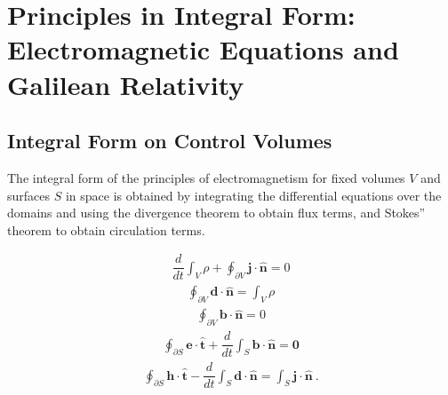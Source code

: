 \documentclass[letterpaper,10pt,italian]{jupyterBook}
\begin{document}
\section{Principles in Integral Form: Electromagnetic Equations and Galilean Relativity}
\label{\detokenize{ch/principles:principles-in-integral-form-electromagnetic-equations-and-galilean-relativity}}\label{\detokenize{ch/principles:classical-electromagnetism-principles-integral}}

\subsection{Integral Form on Control Volumes}
\label{\detokenize{ch/principles:integral-form-on-control-volumes}}\label{\detokenize{ch/principles:classical-electromagnetism-principles-integral-control-volume}}
\sphinxAtStartPar
The integral form of the principles of electromagnetism for fixed volumes \(V\) and surfaces \(S\) in space is obtained by integrating the differential equations over the domains and using the divergence theorem to obtain flux terms, and Stokes” theorem to obtain circulation terms.

\sphinxAtStartPar
{}
\begin{equation*}
\begin{split}
    \dfrac{d}{dt} \int_{V} \rho + \oint_{\partial V} \mathbf{j} \cdot \hat{\mathbf{n}} = 0
\end{split}
\end{equation*}
\sphinxAtStartPar
{}
\begin{equation*}
\begin{split}
    \oint_{\partial V} \mathbf{d} \cdot \mathbf{\hat{n}} = \int_{V} \rho
\end{split}
\end{equation*}
\sphinxAtStartPar
{}
\begin{equation*}
\begin{split}
    \oint_{\partial V} \mathbf{b} \cdot \mathbf{\hat{n}} = 0
\end{split}
\end{equation*}
\sphinxAtStartPar
{}
\begin{equation*}
\begin{split}
    \oint_{\partial S} \mathbf{e} \cdot \hat{\mathbf{t}} + \dfrac{d}{dt} \int_{S} \mathbf{b} \cdot \hat{\mathbf{n}} = \mathbf{0}
\end{split}
\end{equation*}
\sphinxAtStartPar
{}
\begin{equation*}
\begin{split}
    \oint_{\partial S} \mathbf{h} \cdot \hat{\mathbf{t}} - \dfrac{d}{dt} \int_{S} \mathbf{d} \cdot \hat{\mathbf{n}} = \int_{S} \mathbf{j} \cdot \hat{\mathbf{n}} \ .
\end{split}
\end{equation*}
\end{document}
